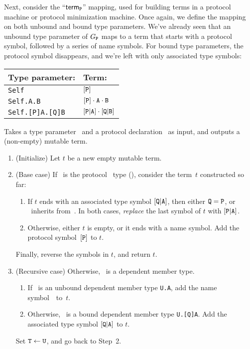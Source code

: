 \documentclass[../generics]{subfiles}
\begin{document}
\smallskip

Next, consider the ``$\mathsf{term}_{\texttt{P}}$'' mapping, used for building terms in a protocol machine or protocol minimization machine. Once again, we define the mapping on both unbound and bound type parameters. We've already seen that an unbound type parameter of $G_{\texttt{P}}$ maps to a term that starts with a protocol symbol, followed by a series of name symbols. For bound type parameters, the protocol symbol disappears, and we're left with only associated type symbols:
\begin{center}
\begin{tabular}{ll}
\toprule
\textbf{Type parameter:}&\textbf{Term:}\\
\midrule
\texttt{Self}&$[\texttt{P}]$\\
\texttt{Self.A.B}&$[\texttt{P}]\cdot\texttt{A}\cdot\texttt{B}$\\
\texttt{Self.[P]A.[Q]B}&$[\texttt{P}|\texttt{A}]\cdot[\texttt{Q}|\texttt{B}]$\\
\bottomrule
\end{tabular}
\end{center}

\begin{algorithm}\label{build term protocol}
Takes a type parameter \tT\ and a protocol declaration \tP\ as input, and outputs a (non-empty) mutable term.
\begin{enumerate}
\item (Initialize) Let $t$ be a new empty mutable term.
\item (Base case) If \tT\ is the protocol \tSelf\ type (), consider the term~$t$ constructed so far:
\begin{enumerate}
\item If $t$ ends with an associated type symbol $[\texttt{Q}|\texttt{A}]$, then either $\texttt{Q}=\texttt{P}$, or \tP\ inherits from~\tQ. In both cases, \emph{replace} the last symbol of $t$ with $[\texttt{P}|\texttt{A}]$.
\item Otherwise, either $t$ is empty, or it ends with a name symbol. Add the protocol symbol~$[\texttt{P}]$ to $t$.
\end{enumerate}
Finally, reverse the symbols in $t$, and return $t$.
\item (Recursive case) Otherwise, \tT\ is a dependent member type.
\begin{enumerate}
\item If \tT\ is an unbound dependent member type \verb|U.A|, add the name symbol~\nA\ to~$t$.
\item Otherwise, \tT\ is a bound dependent member type \verb|U.[Q]A|. Add the associated type symbol $[\texttt{Q}|\texttt{A}]$ to $t$.
\end{enumerate}
Set $\texttt{T} \leftarrow \texttt{U}$, and go back to Step~2.
\end{enumerate}
\end{algorithm}
\end{document}
